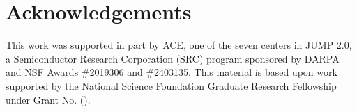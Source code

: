 \section{Acknowledgements}\label{sec:acknowledgements}
This work was supported in part by ACE, one of the seven centers in JUMP 2.0, a
Semiconductor Research Corporation (SRC) program sponsored by DARPA and NSF
Awards \#2019306 and \#2403135. This material is based upon work supported by
the National Science Foundation Graduate Research Fellowship under Grant No.
().
